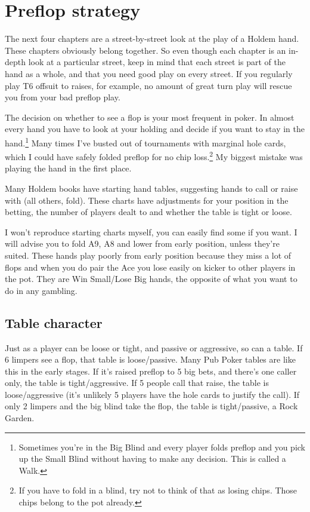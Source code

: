 \chapter{Preflop strategy}


The next four chapters are a street-by-street look at the play of a
Holdem hand. These chapters obviously belong together. So even though
each chapter is an in-depth look at a particular street, keep in mind
that each street is part of the hand as a whole, and that you need
good play on every street. If you regularly play T6 offsuit to raises,
for example, no amount of great turn play will rescue you from your
bad preflop play.

The decision on whether to see a flop is your most
frequent in poker. In almost every hand you have to look at your
holding and decide if you want to stay in the hand.\footnote{Sometimes
you're in the Big Blind and every player folds preflop and you pick
up the Small Blind without having to make any decision. This is called
a Walk.} Many times I've
busted out of tournaments with marginal hole
cards, which I could have safely folded preflop
for no chip loss.\footnote{If you have to fold in a blind, try not to
think of that as losing chips. Those chips belong to the pot already.}
My biggest mistake was playing the hand in the first place.

Many Holdem books have starting hand tables, suggesting
hands to call or raise with (all others, fold). These
charts have adjustments for your position in the betting,
the number of players dealt to and whether the table is tight or loose.

I won't reproduce starting charts myself, you can easily find some
if you want. I will advise you to fold A9, A8 and lower from early
position, unless they're suited. These hands play poorly from
early position because they miss a lot of flops and when you do
pair the Ace you lose easily on kicker to other players in the pot.
They are Win Small/Lose Big hands, the opposite of what you want to do
in any gambling.

\section{Table character}

Just as a player can be loose or tight, and passive or
aggressive, so can a table. If 6 limpers see a flop,
that table is loose/passive. Many Pub Poker tables are like this
in the early stages. If it's raised preflop to
5 big bets, and there's one caller only, the table is
tight/aggressive. If 5 people call that raise, the table
is loose/aggressive (it's unlikely 5 players have the hole
cards to justify the call). If only 2 limpers and the big blind
take the flop, the table is tight/passive, a Rock Garden.

